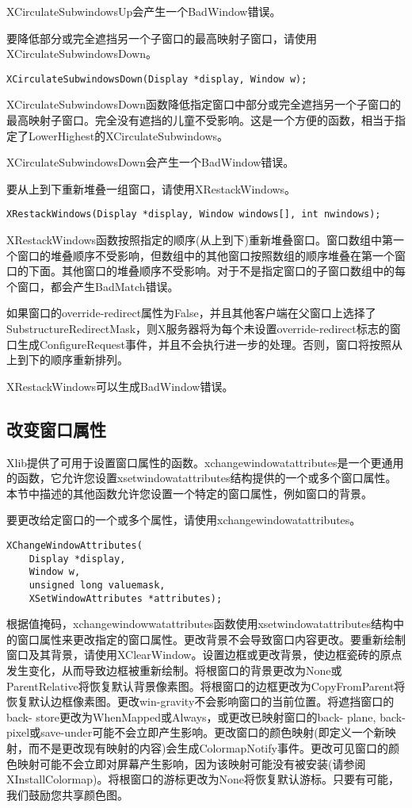 \noindent XCirculateSubwindowsUp会产生一个BadWindow错误。

要降低部分或完全遮挡另一个子窗口的最高映射子窗口，请使用XCirculateSubwindowsDown。
\begin{lstlisting}
XCirculateSubwindowsDown(Display *display, Window w);
\end{lstlisting}

XCirculateSubwindowsDown函数降低指定窗口中部分或完全遮挡另一个子窗口的最高映射子窗口。完全没有遮挡的儿童不受影响。这是一个方便的函数，相当于指定了LowerHighest的XCirculateSubwindows。

\noindent XCirculateSubwindowsDown会产生一个BadWindow错误。

\noindent 要从上到下重新堆叠一组窗口，请使用XRestackWindows。
\begin{lstlisting}
XRestackWindows(Display *display, Window windows[], int nwindows);
\end{lstlisting}

XRestackWindows函数按照指定的顺序(从上到下)重新堆叠窗口。窗口数组中第一个窗口的堆叠顺序不受影响，但数组中的其他窗口按照数组的顺序堆叠在第一个窗口的下面。其他窗口的堆叠顺序不受影响。对于不是指定窗口的子窗口数组中的每个窗口，都会产生BadMatch错误。

如果窗口的override-redirect属性为False，并且其他客户端在父窗口上选择了SubstructureRedirectMask，则X服务器将为每个未设置override-redirect标志的窗口生成ConfigureRequest事件，并且不会执行进一步的处理。否则，窗口将按照从上到下的顺序重新排列。

\noindent XRestackWindows可以生成BadWindow错误。


\subsection{改变窗口属性}

Xlib提供了可用于设置窗口属性的函数。xchangewindowatattributes是一个更通用的函数，它允许您设置xsetwindowatattributes结构提供的一个或多个窗口属性。本节中描述的其他函数允许您设置一个特定的窗口属性，例如窗口的背景。

要更改给定窗口的一个或多个属性，请使用xchangewindowatattributes。

\begin{lstlisting}
XChangeWindowAttributes(
	Display *display,
	Window w,
	unsigned long valuemask,
	XSetWindowAttributes *attributes);
\end{lstlisting}

根据值掩码，xchangewindowwatattributes函数使用xsetwindowatattributes结构中的窗口属性来更改指定的窗口属性。更改背景不会导致窗口内容更改。要重新绘制窗口及其背景，请使用XClearWindow。设置边框或更改背景，使边框瓷砖的原点发生变化，从而导致边框被重新绘制。将根窗口的背景更改为None或ParentRelative将恢复默认背景像素图。将根窗口的边框更改为CopyFromParent将恢复默认边框像素图。更改win-gravity不会影响窗口的当前位置。将遮挡窗口的back- store更改为WhenMapped或Always，或更改已映射窗口的back- plane, back- pixel或save-under可能不会立即产生影响。更改窗口的颜色映射(即定义一个新映射，而不是更改现有映射的内容)会生成ColormapNotify事件。更改可见窗口的颜色映射可能不会立即对屏幕产生影响，因为该映射可能没有被安装(请参阅XInstallColormap)。将根窗口的游标更改为None将恢复默认游标。只要有可能，我们鼓励您共享颜色图。

